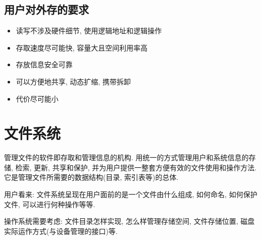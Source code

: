 \documentclass[a4paper, UTF8]{article}
\begin{document}
\subsection{用户对外存的要求}
\begin{itemize}
\item 读写不涉及硬件细节, 使用逻辑地址和逻辑操作
\item 存取速度尽可能快, 容量大且空间利用率高
\item 存放信息安全可靠
\item 可以方便地共享, 动态扩缩, 携带拆卸
\item 代价尽可能小
\end{itemize}

\newpage
\section{文件系统}
管理文件的软件即存取和管理信息的机构. 用统一的方式管理用户和系统信息的存储, 检索, 更新, 共享和保护, 并为用户提供一整套方便有效的文件使用和操作方法. 它是管理文件所需要的数据结构(目录, 索引表等)的总体.\par
用户看来: 文件系统呈现在用户面前的是一个文件由什么组成, 如何命名, 如何保护文件, 可以进行何种操作等等.\par
操作系统需要考虑: 文件目录怎样实现, 怎么样管理存储空间, 文件存储位置, 磁盘实际运作方式(与设备管理的接口)等.\par
\end{document}
